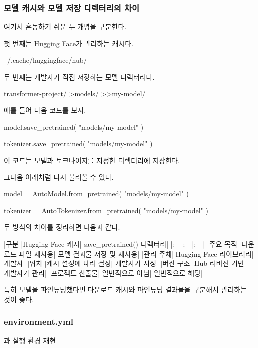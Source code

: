 \subsubsection{모델 캐시와 모델 저장 디렉터리의 차이}

여기서 혼동하기 쉬운 두 개념을 구분한다.

첫 번째는 Hugging Face가 관리하는 캐시다.

\begin{dhkzsh}
~/.cache/huggingface/hub/
\end{dhkzsh}

두 번째는 개발자가 직접 저장하는 모델 디렉터리다.

\begin{dhkdir}[in=6]
transformer-project/
>models/
>>my-model/
\end{dhkdir}

예를 들어 다음 코드를 보자.

\begin{dhkcode}
model.save_pretrained(
    "models/my-model"
)

tokenizer.save_pretrained(
    "models/my-model"
)
\end{dhkcode}

이 코드는 모델과 토크나이저를 지정한 디렉터리에 저장한다.

그다음 아래처럼 다시 불러올 수 있다.

\begin{dhkcode}
model = AutoModel.from_pretrained(
    "models/my-model"
)

tokenizer = AutoTokenizer.from_pretrained(
    "models/my-model"
)
\end{dhkcode}

두 방식의 차이를 정리하면 다음과 같다.

\begin{dhktable}
|구분	|Hugging Face 캐시|	save_pretrained() 디렉터리|
|:---|:---|:---|
|주요 목적|	다운로드 파일 재사용|	모델 결과물 저장 및 재사용|
|관리 주체|	Hugging Face 라이브러리|	개발자|
|위치	|캐시 설정에 따라 결정|	개발자가 지정|
|버전 구조|	Hub 리비전 기반|	개발자가 관리|
|프로젝트 산출물|	일반적으로 아님|	일반적으로 해당|
\end{dhktable}

특히 모델을 파인튜닝했다면 다운로드 캐시와 파인튜닝 결과물을 구분해서 관리하는 것이 좋다.

\subsubsection{environment.yml}과 실행 환경 재현

